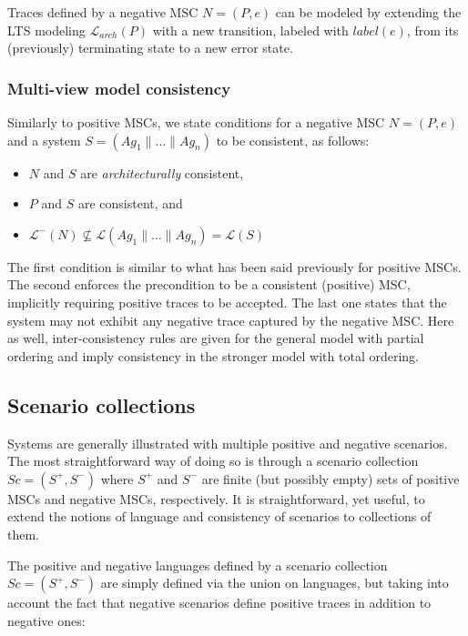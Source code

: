 Traces defined by a negative MSC $N = (P,e)$ can be modeled by extending the LTS modeling $\mathcal{L}_{arch}(P)$ with a new transition, labeled with $label(e)$, from its (previously) terminating state to a new error state.

\subsubsection*{Multi-view model consistency}

Similarly to positive MSCs, we state conditions for a negative MSC $N = (P,e)$ and a system $S = (Ag_1 \parallel \ldots \parallel Ag_n)$ to be consistent, as follows:

\begin{itemize}
\item $N$ and $S$ are \emph{architecturally} consistent,
\item $P$ and $S$ are consistent, and
\item $\mathcal{L}^{-}(N) \not\subseteq \mathcal{L}(Ag_1 \parallel \ldots \parallel Ag_n) = \mathcal{L}(S)$
\end{itemize}

The first condition is similar to what has been said previously for positive MSCs. The second enforces the precondition to be a consistent (positive) MSC, implicitly requiring positive traces to be accepted. The last one states that the system may not exhibit any negative trace captured by the negative MSC. Here as well, inter-consistency rules are given for the general model with partial ordering and imply consistency in the stronger model with total ordering.

\subsection{Scenario collections}

Systems are generally illustrated with multiple positive and negative scenarios. The most straightforward way of doing so is through a scenario collection $Sc = (S^+,S^-)$ where $S^+$ and $S^-$ are finite (but possibly empty) sets of positive MSCs and negative MSCs, respectively. It is straightforward, yet useful, to extend the notions of language and consistency of scenarios to collections of them. 

The positive and negative languages defined by a scenario collection $Sc = (S^+,S^-)$ are simply defined via the union on languages, but taking into account the fact that negative scenarios define positive traces in addition to negative ones:

